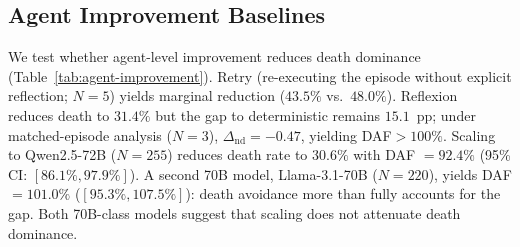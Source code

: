 \begin{table}[t]
\centering
\scriptsize
\setlength{\tabcolsep}{3pt}
\caption{Leave-one-task-out DAF sensitivity (label fraction). Removing any death-prone task changes DAF by $\leq$3.0\,pp. $\dagger$\,Sole death-free task; removal raises DAF to 100\% by construction.}
\label{tab:loto-daf}
\end{table}

\subsection{Agent Improvement Baselines}
\label{sec:agent-improvement}

We test whether agent-level improvement reduces death dominance (Table~\ref{tab:agent-improvement}). Retry (re-executing the episode without explicit reflection; $N{=}5$) yields marginal reduction ($43.5\%$ vs.\ $48.0\%$). Reflexion~\citep{reflexion-2023} reduces death to $31.4\%$ but the gap to deterministic remains $15.1$~pp; under matched-episode analysis ($N{=}3$), $\Delta_{\text{nd}} = -0.47$, yielding DAF${}>100\%$. Scaling to Qwen2.5-72B ($N{=}255$) reduces death rate to $30.6\%$ with DAF $= 92.4\%$ (95\% CI: $[86.1\%, 97.9\%]$). A second 70B model, Llama-3.1-70B ($N{=}220$), yields DAF $= 101.0\%$ ($[95.3\%, 107.5\%]$): death avoidance more than fully accounts for the gap. Both 70B-class models suggest that scaling does not attenuate death dominance.

